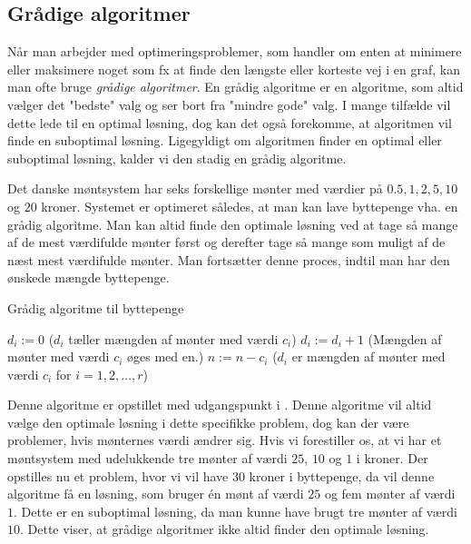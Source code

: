 \subsection{Grådige algoritmer}
Når man arbejder med optimeringsproblemer, som handler om enten at minimere eller maksimere noget som fx at finde den længste eller korteste vej i en graf, kan man ofte bruge \emph{grådige algoritmer}.
En grådig algoritme er en algoritme, som altid vælger det "bedste" valg og ser bort fra "mindre gode" valg. I mange tilfælde vil dette lede til en optimal løsning, dog kan det også forekomme, at algoritmen vil finde en suboptimal løsning. Ligegyldigt om algoritmen finder en optimal eller suboptimal løsning, kalder vi den stadig en grådig algoritme.

\begin{exmp}
Det danske møntsystem har seks forskellige mønter med værdier på $0.5, 1, 2, 5, 10$ og $20$ kroner. Systemet er optimeret således, at man kan lave byttepenge vha. en grådig algoritme. Man kan altid finde den optimale løsning ved at tage så mange af de mest værdifulde mønter først og derefter tage så mange som muligt af de næst mest værdifulde mønter. Man fortsætter denne proces, indtil man har den ønskede mængde byttepenge.
\begin{algorithm} [H]
\caption{Grådig algoritme til byttepenge}
\begin{algorithmic}[1]

\EndProcedure
{}
    \State $d_i:=0$ ($d_i$ tæller mængden af mønter med værdi $c_i$)
    	\State $d_i := d_i+1$ (Mængden af mønter med værdi $c_i$ øges med en.)
    	\State $n := n-c_i$
\EndWhile
\EndFor
\State ($d_i$ er mængden af mønter med værdi $c_i$ for $i=1,2,\dotsc,r$)
\end{algorithmic}
\end{algorithm}
Denne algoritme er opstillet med udgangspunkt i \citep{dmat}. Denne algoritme vil altid vælge den optimale løsning i dette specifikke problem, dog kan der være problemer, hvis mønternes værdi ændrer sig. 
Hvis vi forestiller os, at vi har et møntsystem med udelukkende tre mønter af værdi $25$, $10$ og $1$ i kroner. Der opstilles nu et problem, hvor vi vil have $30$ kroner i byttepenge, da vil denne algoritme få en løsning, som bruger én mønt af værdi $25$ og fem mønter af værdi $1$. Dette er en suboptimal løsning, da man kunne have brugt tre mønter af værdi $10$.
Dette viser, at grådige algoritmer ikke altid finder den optimale løsning.
\end{exmp}

